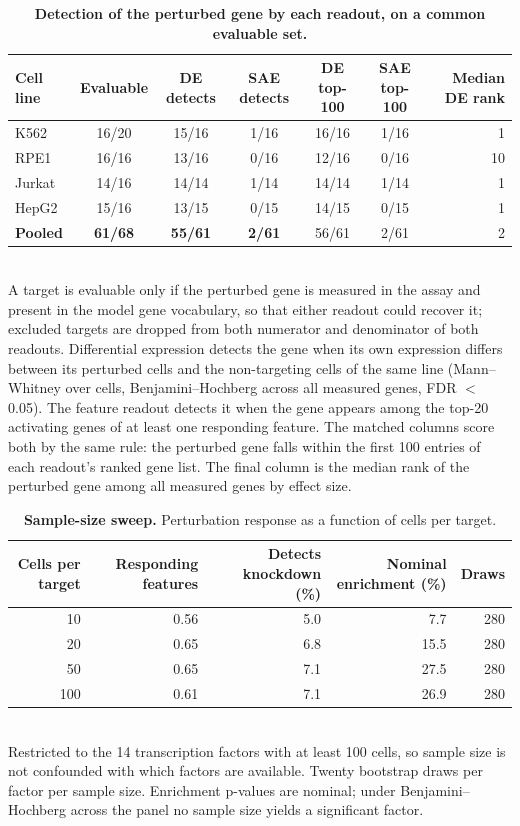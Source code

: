 \documentclass[11pt]{article}
\begin{document}
\begin{table}[htbp]
\centering
\caption{\textbf{Detection of the perturbed gene by each readout, on a common evaluable set.}}
\label{tab:self_detection}
\smallskip
\small
\begin{tabular}{lcccccr}
\toprule
Cell line & Evaluable & DE detects & SAE detects & DE top-100 & SAE top-100 & Median DE rank \\
\midrule
K562 & 16/20 & 15/16 & 1/16 & 16/16 & 1/16 & 1 \\
RPE1 & 16/16 & 13/16 & 0/16 & 12/16 & 0/16 & 10 \\
Jurkat & 14/16 & 14/14 & 1/14 & 14/14 & 1/14 & 1 \\
HepG2 & 15/16 & 13/15 & 0/15 & 14/15 & 0/15 & 1 \\
\midrule
\textbf{Pooled} & \textbf{61/68} & \textbf{55/61} & \textbf{2/61} & 56/61 & 2/61 & 2 \\
\bottomrule
\end{tabular}
\\[2pt]
\footnotesize A target is evaluable only if the perturbed gene is measured in the assay and present in the model gene vocabulary, so that either readout could recover it; excluded targets are dropped from both numerator and denominator of both readouts. Differential expression detects the gene when its own expression differs between its perturbed cells and the non-targeting cells of the same line (Mann--Whitney over cells, Benjamini--Hochberg across all measured genes, FDR $<$ 0.05). The feature readout detects it when the gene appears among the top-20 activating genes of at least one responding feature. The matched columns score both by the same rule: the perturbed gene falls within the first 100 entries of each readout's ranked gene list. The final column is the median rank of the perturbed gene among all measured genes by effect size.
\end{table}

\begin{table}[htbp]
\centering
\caption{\textbf{Sample-size sweep.} Perturbation response as a function of cells per target.}
\label{tab:sweep}
\smallskip
\small
\begin{tabular}{rrrrr}
\toprule
Cells per target & Responding features & Detects knockdown (\%) & Nominal enrichment (\%) & Draws \\
\midrule
10 & 0.56 & 5.0 & 7.7 & 280 \\
20 & 0.65 & 6.8 & 15.5 & 280 \\
50 & 0.65 & 7.1 & 27.5 & 280 \\
100 & 0.61 & 7.1 & 26.9 & 280 \\
\bottomrule
\end{tabular}
\\[2pt]
\footnotesize Restricted to the 14 transcription factors with at least 100 cells, so sample size is not confounded with which factors are available. Twenty bootstrap draws per factor per sample size. Enrichment p-values are nominal; under Benjamini--Hochberg across the panel no sample size yields a significant factor.
\end{table}
\end{document}
